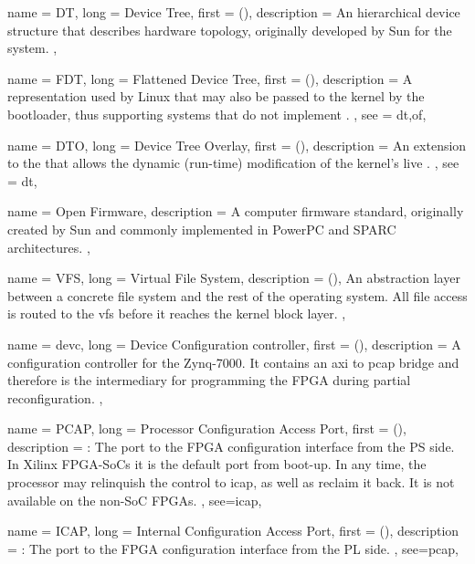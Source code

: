 {
	name = {DT},
	long = {Device Tree},
	first = { ()},
	description = {
		An hierarchical device structure that describes hardware topology,
		originally developed by Sun for the  system.
	},
}


{
	name = {FDT},
	long = {Flattened Device Tree},
	first = { ()},
	description = {
		A  representation used by Linux that may also be
		passed to the kernel by the bootloader, thus supporting systems
		that do not implement .
	},
	see = {dt,of},
}


{
	name = {DTO},
	long = {Device Tree Overlay},
	first = { ()},
	description = {
		An extension to the  that allows the dynamic (run-time) modification
		of the kernel's live .
	},
	see = {dt},
}


{
	name = {Open Firmware},
	description = {
		A computer firmware standard, originally created by Sun and commonly
		implemented in PowerPC and SPARC architectures.
	},
}


{
	name = {VFS},
	long = {Virtual File System},
	description = { (),
		An abstraction layer between a concrete file system and the rest of the operating system.
		All file access is routed to the \gls{vfs} before it reaches the kernel block layer. 
	},
}

{
	name = {devc},
	long = {Device Configuration controller},
	first = { ()},
	description = {
		A configuration controller for the Zynq-7000.
		It contains an \gls{axi} to \gls{pcap} bridge
		and therefore is the intermediary
		for programming the FPGA during partial reconfiguration.
	},
}

{
	name = {PCAP},
	long = {Processor Configuration Access Port},
	first = { ()},
	description = {\emph{}:
		The port to the FPGA configuration interface from the PS side.
		In Xilinx FPGA-SoCs it is the default port from boot-up.
		In any time, the processor may relinquish the control to \gls{icap},
		as well as reclaim it back. It is not available on the non-SoC FPGAs.
	},
	see={icap},
}


{
	name = {ICAP},
	long = {Internal Configuration Access Port},
	first = { ()},
	description = {\emph{}:
		The port to the FPGA configuration interface from the PL side.
	},
	see={pcap},
}


